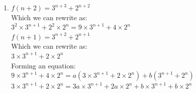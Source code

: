 \documentclass[../main.tex]{subfiles}
\begin{document}
\begin{enumerate}
    Finding initial radius and radius at time \textit{m}:\\
    \begin{align*}
    t=0, V=1      &        &t=m, V=\frac{1}{2}\\
    1=\frac{4}{3}\pi r^3   &     &\frac{1}{2}=\frac{4}{3}\pi r_m^3\\
    r=\sqrt[3]{\frac{3}{4\pi}}   &   &r_m=\sqrt[3]{\frac{3}{8\pi}}=0.49\\
    \end{align*}
    Now we can find \textit{k} and \textit{c}:\\
    When \(t=0\):\\
    \(0.62=k\times 0 + c\)\\
    \(c=0.62\)\\
    \(r=kt+0.62\)\\

    When \(t=m\):\\
    \(0.49=km+0.62\)\\
    \(km=-0.13\)\\
    \(k=-\frac{0.13}{m}\)\\

    Therefore \(r(t)=-\frac{0.13}{m}t+0.62\)\\

    When the sphere has dissolved, the radius equals zero.\\

    \(0=-\frac{0.13}{m}t+0.62\)\\
    \(\frac{0.13}{m}t=0.62\)\\
    \(t=\frac{0.62m}{0.13}=4.77m\)\\
 
    \item 
    \(f(n+2)=3^{n+3}+2^{n+2}\)\\
    Which we can rewrite as:\\
    \(3^2 \times 3^{n+1} + 2^2 \times 2^n=9\times 3^{n+1} + 4 \times 2^n\)\\

    \(f(n+1)=3^{n+2}+2^{n+1}\)\\
    Which we can rewrite as:\\
    \(3 \times 3^{n+1} + 2 \times 2^n\)\\

    Forming an equation:\\
    \(9\times 3^{n+1} + 4 \times 2^n=a(3 \times 3^{n+1} + 2 \times 2^n)+b(3^{n+1}+2^n)\)\\
    \(3 \times 3^{n+1} + 2 \times 2^n=3a \times 3^{n+1}+2a \times 2^n+b\times 3^{n+1}+b\times 2^n\)\\


\end{enumerate}
\end{document}
